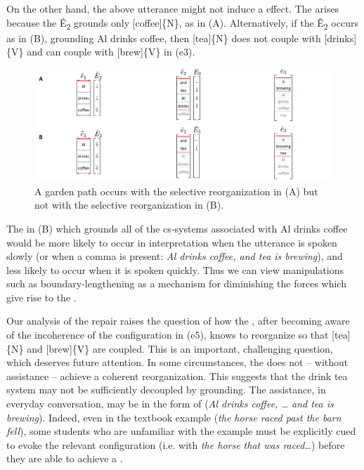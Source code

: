   On the other hand, the above utterance might not induce a  effect. The  arises because the  Ê\textsubscript{2} grounds only [coffee]\{N\}, as in {}(A). Alternatively, if the  Ê\textsubscript{2} occurs as in (B), grounding {\textbar}Al drinks coffee{\textbar}, then [tea]\{N\} does not couple with [drinks]\{V\} and can couple with [brew]\{V\} in (e3).

  
\begin{figure}
\includegraphics[width=\textwidth]{figures/Tilsen-img131.png}
\caption{A garden path occurs with the selective reorganization in (A) but not with the selective reorganization in (B).}
\label{fig:6:12}
\end{figure}
 

  The  in (B) which grounds all of the cs-systems associated with {\textbar}Al drinks coffee{\textbar} would be more likely to occur in interpretation when the utterance is spoken slowly (or when a comma is present: \textit{Al drinks coffee, and tea is brewing}), and less likely to occur when it is spoken quickly. Thus we can view  manipulations such as boundary-lengthening as a mechanism for diminishing the forces which give rise to the .

  Our analysis of the  repair raises the question of how the , after becoming aware of the incoherence of the configuration in (e5), knows to reorganize so that [tea]\{N\} and [brew]\{V\} are coupled. This is an important, challenging question, which deserves future attention. In some circumstances, the  does not -- without assistance -- achieve a coherent reorganization. This suggests that the {\textbar}drink tea{\textbar} system may not be sufficiently decoupled by grounding. The assistance, in everyday conversation, may be in the form of  (\textit{Al drinks coffee, … and tea is brewing}). Indeed, even in the textbook example (\textit{the horse raced past the barn fell}), some students who are unfamiliar with the example must be explicitly cued to evoke the relevant configuration (i.e. with \textit{the horse that was raced…}) before they are able to achieve a . 

